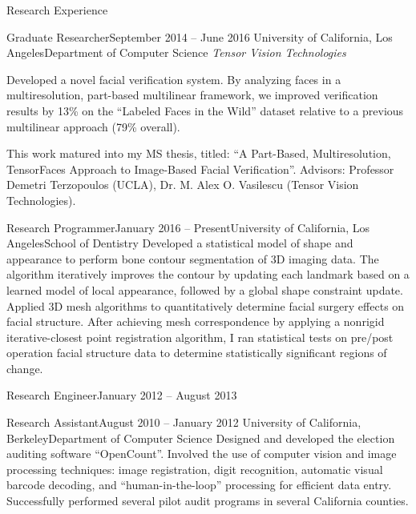 \documentclass{resume}
\begin{document}
\vspace{0.5em}

\begin{component}{Research Experience}
    \begin{position}{Graduate Researcher}{September 2014 -- June 2016}
        {University of California, Los Angeles}{Department of Computer Science}
    \emph{Tensor Vision Technologies}

    {Developed a novel facial verification system. 
By analyzing faces in a multiresolution, part-based multilinear framework, we improved verification results by 13\% on the ``Labeled Faces in the Wild'' dataset relative to a previous multilinear approach (79\% overall).

This work matured into my MS thesis, titled: ``A Part-Based, Multiresolution, TensorFaces Approach to Image-Based Facial Verification''.
Advisors: Professor Demetri Terzopoulos (UCLA), Dr. M. Alex O. Vasilescu (Tensor Vision Technologies).
}
    \end{position}

    \begin{position}{Research Programmer}{January 2016 -- Present}{University of California, Los Angeles}{School of Dentistry}
      {
Developed a statistical model of shape and appearance to perform bone contour segmentation of 3D imaging data.
The algorithm iteratively improves the contour by updating each landmark based on a learned model of local appearance, followed by a global shape constraint update.
\\
Applied 3D mesh algorithms to quantitatively determine facial surgery effects on facial structure.
After achieving mesh correspondence by applying a nonrigid iterative-closest point registration algorithm, I ran statistical tests on pre/post operation facial structure data to determine statistically significant regions of change.
}
      \end{position}


    \begin{position}{Research Engineer}{January 2012 -- August 2013}
        {}{}{}
    \end{position}

\vspace{-3.25em}

    \begin{position}{Research Assistant}{August 2010 -- January 2012}
        {University of California, Berkeley}{Department of Computer Science}
    {Designed and developed the election auditing software ``OpenCount''.
Involved the use of computer vision and image processing techniques: image registration, digit recognition, automatic visual barcode decoding, and ``human-in-the-loop'' processing for efficient data entry.
Successfully performed several pilot audit programs in several California counties.}
    \end{position}
    
\end{component}
\end{document}

